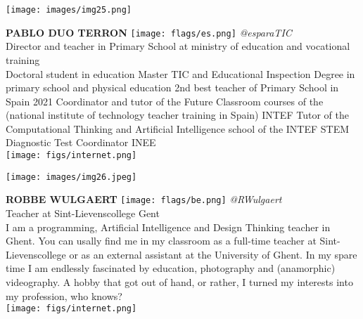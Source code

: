 \noindent
\begin{minipage}{0.3\textwidth}
\centering
\texttt{[image: images/img25.png]}
\end{minipage}
\hfill
\begin{minipage}{0.6\textwidth}\raggedright
\color{color1}\uppercase{\textbf{Pablo Duo Terron}}
\color{color2}\hspace{0.2cm}\texttt{[image: flags/es.png]}
\hspace{0.2cm}\textit{@esparaTIC}
\\
Director and teacher  in Primary School at ministry of education and vocational training\\
{\footnotesize Doctoral student in education 
Master TIC and Educational Inspection 
Degree in primary school and physical education  
2nd best teacher of Primary School in Spain 2021
Coordinator and tutor of the Future Classroom courses of the (national institute of technology teacher training in Spain) INTEF
Tutor of the Computational Thinking and Artificial Intelligence school of the INTEF
STEM Diagnostic Test Coordinator INEE}\\
\texttt{[image: figs/internet.png]}
\end{minipage}
\newline\newline\newline

\noindent
\begin{minipage}{0.3\textwidth}
\centering
\texttt{[image: images/img26.jpeg]}
\end{minipage}
\hfill
\begin{minipage}{0.6\textwidth}\raggedright
\color{color1}\uppercase{\textbf{Robbe Wulgaert}}
\color{color2}\hspace{0.2cm}\texttt{[image: flags/be.png]}
\hspace{0.2cm}\textit{@RWulgaert}
\\
Teacher at Sint-Lievenscollege Gent\\
{\footnotesize I am a programming, Artificial Intelligence and Design Thinking teacher in Ghent. You can usally find me in my classroom as a full-time teacher at Sint-Lievenscollege or as an external assistant at the University of Ghent. In my spare time I am endlessly fascinated by education, photography and (anamorphic) videography. A hobby that got out of hand, or rather, I turned my interests into my profession, who knows?}\\
\texttt{[image: figs/internet.png]}
\end{minipage}
\newline\newline\newline

